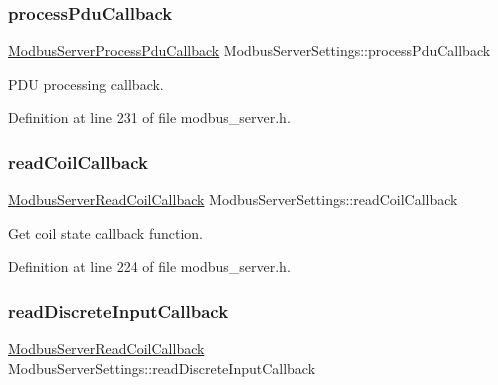 \subsubsection{\texorpdfstring{process\+Pdu\+Callback}{processPduCallback}}
{\footnotesize\ttfamily \hyperlink{modbus__server_8h_a2ff9165ebf9788f21015a64c92cb6075}{Modbus\+Server\+Process\+Pdu\+Callback} Modbus\+Server\+Settings\+::process\+Pdu\+Callback}



P\+DU processing callback. 



Definition at line 231 of file modbus\+\_\+server.\+h.

\mbox{\label{structModbusServerSettings_a5447c4373d3859174ebc5cf30d355ff4}} 
\subsubsection{\texorpdfstring{read\+Coil\+Callback}{readCoilCallback}}
{\footnotesize\ttfamily \hyperlink{modbus__server_8h_a163e3ddadc2ead9869a527e3c2fe1d02}{Modbus\+Server\+Read\+Coil\+Callback} Modbus\+Server\+Settings\+::read\+Coil\+Callback}



Get coil state callback function. 



Definition at line 224 of file modbus\+\_\+server.\+h.

\mbox{\label{structModbusServerSettings_a559d5de77d56d25a06e2bc04c72e08fd}} 
\subsubsection{\texorpdfstring{read\+Discrete\+Input\+Callback}{readDiscreteInputCallback}}
{\footnotesize\ttfamily \hyperlink{modbus__server_8h_a163e3ddadc2ead9869a527e3c2fe1d02}{Modbus\+Server\+Read\+Coil\+Callback} Modbus\+Server\+Settings\+::read\+Discrete\+Input\+Callback}



